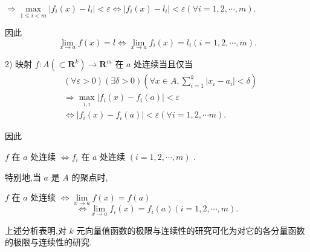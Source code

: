 $\Rightarrow  \mathop{\max }\limits_{{1 \leq  i < m}}\left| {{f}_{i}\left( x\right)  - {l}_{i}}\right|  < \varepsilon  \Leftrightarrow  \left| {{f}_{i}\left( x\right)  - {l}_{i}}\right|  < \varepsilon \left( {\forall i = 1,2,\cdots ,m}\right) .$

因此
$$\mathop{\lim }\limits_{{x \rightarrow  a}}f\left( x\right)  = l \Leftrightarrow  \mathop{\lim }\limits_{{x \rightarrow  a}}{f}_{i}\left( x\right)  = {l}_{i}\left( {i = 1,2,\cdots ,m}\right) .$$

2) 映射 $f : A\left( { \subset  {\mathbf{R}}^{k}}\right)  \rightarrow  {\mathbf{R}}^{m}$ 在 $a$ 处连续当且仅当
\begin{align*}
	&\left( {\forall \varepsilon  > 0}\right) \left( {\exists \delta  > 0}\right) \left( {\forall x \in  A,\mathop{\sum }\limits_{{i = 1}}^{k}\left| {{x}_{i} - {a}_{i}}\right|  < \delta }\right)\\
	&\Rightarrow  \mathop{\max }\limits_{{i,i}}\left| {{f}_{i}\left( x\right)  - {f}_{i}\left( a\right) }\right|  < \varepsilon\\
	&\Leftrightarrow  \left| {{f}_{i}\left( x\right)  - {f}_{i}\left( a\right) }\right|  < \varepsilon \left( {\forall i = 1,2,\cdots m}\right) .
\end{align*}

因此

$f$ 在 $a$ 处连续 $\Leftrightarrow  {f}_{i}$ 在 $a$ 处连续 $\left( {i = 1,2,\cdots ,m}\right)$ .

特别地,当 $a$ 是 $A$ 的聚点时,

$f$ 在 $a$ 处连续 $\Leftrightarrow  \mathop{\lim }\limits_{{x \rightarrow  a}}f\left( x\right)  = f\left( a\right)$
$$\Leftrightarrow  \mathop{\lim }\limits_{{x \rightarrow  a}}{f}_{i}\left( x\right)  = {f}_{i}\left( a\right) \left( {i = 1,2,\cdots ,m}\right) .$$

上述分析表明,对 $k$ 元向量值函数的极限与连续性的研究可化为对它的各分量函数的极限与连续性的研究.

